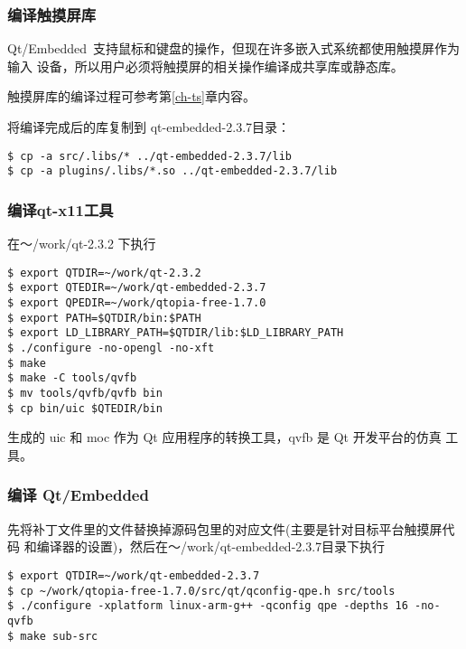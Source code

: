 \subsubsection{编译触摸屏库}
	Qt/Embedded~支持鼠标和键盘的操作，但现在许多嵌入式系统都使用触摸屏作为输入
设备，所以用户必须将触摸屏的相关操作编译成共享库或静态库。

	触摸屏库的编译过程可参考第\ref{ch-ts}章内容。

	将编译完成后的库复制到 qt-embedded-2.3.7目录：

\begin{boxedminipage}{.9\textwidth}
\begin{verbatim}
$ cp -a src/.libs/* ../qt-embedded-2.3.7/lib
$ cp -a plugins/.libs/*.so ../qt-embedded-2.3.7/lib
\end{verbatim}
\end{boxedminipage}

\subsubsection{编译qt-x11工具}
	在～/work/qt-2.3.2 下执行

\begin{boxedminipage}{.9\textwidth}
\begin{verbatim}
$ export QTDIR=~/work/qt-2.3.2
$ export QTEDIR=~/work/qt-embedded-2.3.7
$ export QPEDIR=~/work/qtopia-free-1.7.0
$ export PATH=$QTDIR/bin:$PATH
$ export LD_LIBRARY_PATH=$QTDIR/lib:$LD_LIBRARY_PATH
$ ./configure -no-opengl -no-xft
$ make
$ make -C tools/qvfb
$ mv tools/qvfb/qvfb bin
$ cp bin/uic $QTEDIR/bin
\end{verbatim}
\end{boxedminipage}

	生成的 uic 和 moc 作为 Qt 应用程序的转换工具，qvfb 是 Qt 开发平台的仿真
工具。

\subsubsection{编译 Qt/Embedded}
	先将补丁文件里的文件替换掉源码包里的对应文件(主要是针对目标平台触摸屏代码
和编译器的设置)，然后在～/work/qt-embedded-2.3.7目录下执行

\begin{boxedminipage}{.9\textwidth}
\begin{verbatim} 
$ export QTDIR=~/work/qt-embedded-2.3.7
$ cp ~/work/qtopia-free-1.7.0/src/qt/qconfig-qpe.h src/tools
$ ./configure -xplatform linux-arm-g++ -qconfig qpe -depths 16 -no-qvfb
$ make sub-src
\end{verbatim}
\end{boxedminipage}

